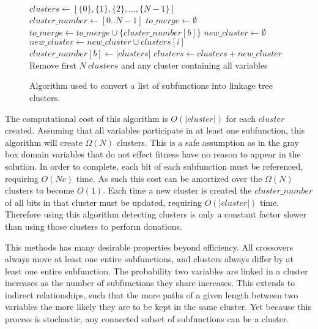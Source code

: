 \begin{figure}
  \begin{algorithmic}[1]
    \State $clusters \leftarrow [\{0\}, \{1\}, \{2\}, \dots, \{N-1\}]$
    \State $cluster\_number \leftarrow [0 .. N-1]$
      \State $to\_merge \leftarrow \emptyset$
        \State $to\_merge \leftarrow to\_merge \cup \{cluster\_number[b]\}$
      \EndFor
        \State $new\_cluster \leftarrow \emptyset$
          \State $new\_cluster \leftarrow new\_cluster \cup clusters[i]$
        \EndFor
          \State $cluster\_number[b] \leftarrow |clusters|$
        \EndFor
        \State $clusters \leftarrow clusters + new\_cluster$
      \EndIf
    \EndFor
    \State Remove first $N~clusters$ and any cluster containing all variables
  \EndProcedure
\end{algorithmic}
  \caption{Algorithm used to convert a list of subfunctions into linkage tree clusters.}
  \label{fig-sfx-tree}
\end{figure}

The computational cost of this algorithm is $O(|cluster|)$ for each $cluster$ created.
Assuming that all variables participate in at least one subfunction, this algorithm will create
$\Omega(N)$ clusters. This is a safe assumption as in the gray box domain variables that do not
effect fitness have no reason to appear in the solution.
In order to complete,
each bit of each subfunction must be referenced, requiring $O(Nc)$ time. As such this cost can
be amortized over the $\Omega(N)$ clusters to become $O(1)$.
Each time a new cluster is created
the $cluster\_number$ of all bits in that cluster must be updated, requiring $O(|cluster|)$ time.
Therefore using this algorithm detecting clusters is only a constant factor slower than using those clusters
to perform donations.

This methods has many desirable properties beyond efficiency. All crossovers always move at least one entire subfunctions,
and clusters always differ by at least one entire subfunction. The probability two variables are linked in a
cluster increases as the number of subfunctions they share increases. This extends to indirect relationships, such that
the more paths of a given length between two variables the more likely they are to be kept in the same cluster.
Yet because this process is stochastic, any connected subset of subfunctions can be a cluster.

